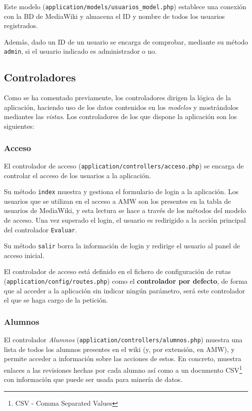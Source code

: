 \documentclass[11pt]{article}
\begin{document}
Este modelo (\texttt{application/models/usuarios\_model.php}) establece una
conexión con la BD de MediaWiki y almacena el ID y nombre de todos los usuarios
registrados.

Además, dado un ID de un usuario se encarga de comprobar, mediante su método
\texttt{admin}, si el usuario indicado es administrador o no.


\subsection{Controladores}

Como se ha comentado previamente, los controladores dirigen la lógica de la
aplicación, haciendo uso de los datos contenidos en los \textit{modelos} y
mostrándolos mediantes las \textit{vistas}. Los controladores de los que dispone
la aplicación son los siguientes:

\subsubsection{Acceso}

El controlador de acceso (\texttt{application/controllers/acceso.php}) se
encarga de controlar el acceso de los usuarios a la aplicación. 

Su método \texttt{index} muestra y gestiona el formulario de login a la
aplicación. Los usuarios que se utilizan en el acceso a AMW son los presentes en
la tabla de usuarios de MediaWiki, y esta lectura se hace a través de los
métodos del modelo de acceso. Una vez superado el login, el usuario es
redirigido a la acción principal del controlador \texttt{Evaluar}.

Su método \texttt{salir} borra la información de login y redirige el usuario al
panel de acceso inicial.

El controlador de acceso está definido en el fichero de configuración de rutas
(\texttt{application/config/routes.php}) como el \textbf{controlador por
  defecto}, de forma que al acceder a la aplicación sin indicar ningún
parámetro, será este controlador el que se haga cargo de la petición.

\subsubsection{Alumnos}

El controlador \textit{Alumnos} (\texttt{application/controllers/alumnos.php})
muestra una lista de todos los alumnos presentes en el wiki (y, por extensión,
en AMW), y permite acceder a información sobre las acciones de estos. En
concreto, muestra enlaces a las revisiones hechas por cada alumno así como a un
documento CSV\footnote{CSV - Comma Separated Values} con información que puede
ser usada para minería de datos.
\end{document}
